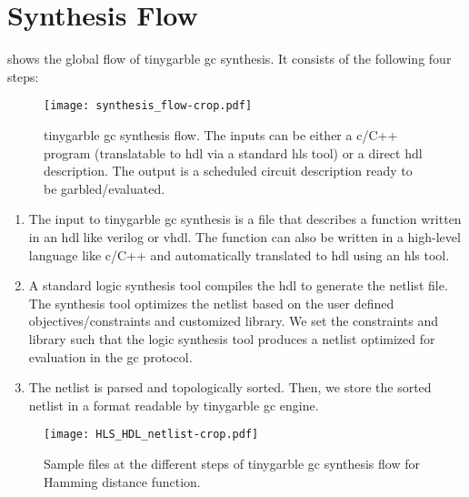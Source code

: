 \section{Synthesis Flow}\label{sec:syn-flow}
 shows the global flow of \gls{tinygarble} \acrshort{gc} synthesis.
It consists of the following four steps:

\begin{figure}
\centering
\texttt{[image: synthesis\_flow-crop.pdf]}
\caption{\gls{tinygarble} \acrshort{gc} synthesis flow.
  The inputs can be either a \gls{c}/C++ program (translatable to \acrshort{hdl} via a standard \acrshort{hls} tool) or a direct \acrshort{hdl} description.
  The output is a scheduled circuit description ready to be garbled/evaluated.}
\label{fig:synthesis-flow}
\end{figure}

\begin{enumerate}
\item The input to \gls{tinygarble} \acrshort{gc} synthesis is a file that describes a function written in an \acrshort{hdl} like \gls{verilog} or \gls{vhdl}.
      The function can also be written in a high-level language like \gls{c}/C++ and automatically translated to \acrshort{hdl} using an \acrshort{hls} tool.

\item A standard logic synthesis tool compiles the \acrshort{hdl} to generate the \gls{netlist} file.
      The synthesis tool optimizes the \gls{netlist} based on the user defined objectives/constraints and customized library.
      We set the constraints and library such that the logic synthesis tool produces a \gls{netlist} optimized for evaluation in the \acrshort{gc} protocol.

\item The \gls{netlist} is parsed and topologically sorted.
      Then, we store the sorted \gls{netlist} in a format readable by \gls{tinygarble} \acrshort{gc} engine.
\end{enumerate}

\begin{figure}
\centering
\texttt{[image: HLS\_HDL\_netlist-crop.pdf]}
\caption{Sample files at the different steps of \gls{tinygarble} \acrshort{gc} synthesis flow for Hamming distance function.}
\label{fig:globalflow_sample}
\end{figure}

